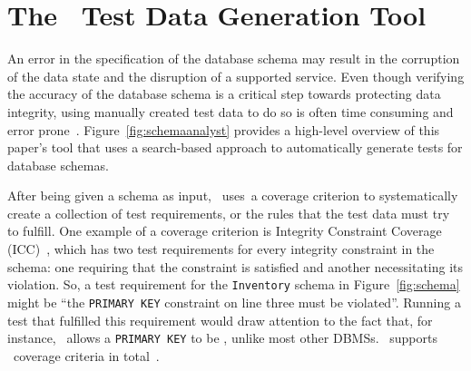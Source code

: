 
\section{The \sa~Test Data Generation Tool}\label{sec:technique}


An error in the specification of the database schema may result in the corruption of the data state and the disruption
of a supported service. Even though verifying the accuracy of the database schema is a critical step towards protecting
data integrity, using manually created test data to do so is often time consuming and error
prone~\cite{kapfhammer2013search}. Figure~\ref{fig:schemaanalyst} provides a high-level overview of this paper's tool
that uses a search-based approach to automatically generate tests for database schemas.


After being given a schema as input, \mbox{\sa~uses a} coverage criterion to systematically create a collection of test
requirements, or the rules that the test data must try to fulfill. One example of a coverage criterion
is Integrity Constraint Coverage (ICC)~\cite{mcminn2015effectiveness}, which has two test requirements for every
integrity constraint in the schema: one requiring that the constraint is satisfied and another necessitating its
violation. So, a test requirement for the \texttt{Inventory} schema in Figure~\ref{fig:schema} might be ``the
\texttt{PRIMARY KEY} constraint on line three must be violated''. Running a test that fulfilled this requirement would
draw attention to the fact that, for instance, \sqlite~allows a \texttt{PRIMARY KEY} to be \NULL, unlike most other
DBMSs. \sa~supports \numcoveragecriteria~coverage criteria in total~\cite{mcminn2015effectiveness}.





